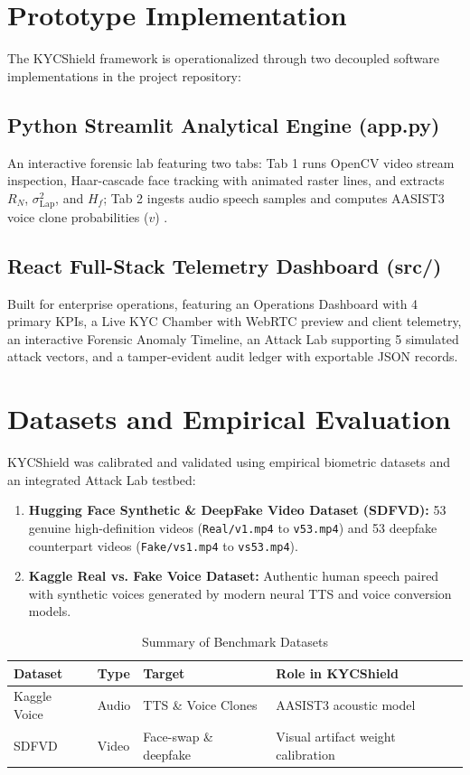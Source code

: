 \documentclass[conference]{IEEEtran}
\begin{document}
\section{Prototype Implementation}
The KYCShield framework is operationalized through two decoupled software implementations in the project repository:

\subsection{Python Streamlit Analytical Engine (app.py)}
An interactive forensic lab featuring two tabs: Tab 1 runs OpenCV video stream inspection, Haar-cascade face tracking with animated raster lines, and extracts $R_N$, $\sigma^2_{\text{Lap}}$, and $H_f$; Tab 2 ingests audio speech samples and computes AASIST3 voice clone probabilities ($v$) \cite{borodin2024aasist3}.

\subsection{React Full-Stack Telemetry Dashboard (src/)}
Built for enterprise operations, featuring an Operations Dashboard with 4 primary KPIs, a Live KYC Chamber with WebRTC preview and client telemetry, an interactive Forensic Anomaly Timeline, an Attack Lab supporting 5 simulated attack vectors, and a tamper-evident audit ledger with exportable JSON records.

\section{Datasets and Empirical Evaluation}
KYCShield was calibrated and validated using empirical biometric datasets and an integrated Attack Lab testbed:
\begin{enumerate}
    \item \textbf{Hugging Face Synthetic \& DeepFake Video Dataset (SDFVD):} 53 genuine high-definition videos (\texttt{Real/v1.mp4} to \texttt{v53.mp4}) and 53 deepfake counterpart videos (\texttt{Fake/vs1.mp4} to \texttt{vs53.mp4}).
    \item \textbf{Kaggle Real vs. Fake Voice Dataset:} Authentic human speech paired with synthetic voices generated by modern neural TTS and voice conversion models.
\end{enumerate}

\begin{table}[h]
\centering
\caption{Summary of Benchmark Datasets}
\label{tab:datasets}
\begin{tabular}{llll}
\toprule
\textbf{Dataset} & \textbf{Type} & \textbf{Target} & \textbf{Role in KYCShield} \\
\midrule
Kaggle Voice & Audio & TTS \& Voice Clones & AASIST3 acoustic model \cite{borodin2024aasist3} \\
SDFVD & Video & Face-swap \& deepfake & Visual artifact weight calibration \\
\bottomrule
\end{tabular}
\end{table}
\end{document}

